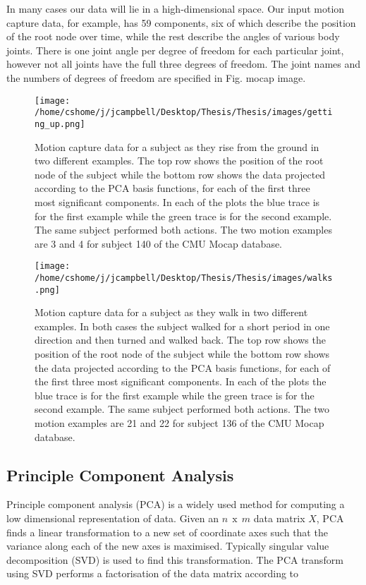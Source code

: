 In many cases our data will lie in a high-dimensional space. Our input motion capture data, for example, has 59 components, six of which describe the position of the root node over time, while the rest describe the angles of various body joints. There is one joint angle per degree of freedom for each particular joint, however not all joints have the full three degrees of freedom. The joint names and the numbers of degrees of freedom are specified in Fig. {mocap image}.\\

\begin{figure}[h]
\texttt{[image: /home/cshome/j/jcampbell/Desktop/Thesis/Thesis/images/getting\_up.png]}
\caption{Motion capture data for a subject as they rise from the ground in two 	different examples. The top row shows the position of the root node of the subject while the bottom row shows the data projected according to the PCA basis functions, for each of the first three most significant components. In each of the plots the blue trace is for the first example while the green trace is for the second example. The same subject performed both actions. The two motion examples are 3 and 4 for subject 140 of the CMU Mocap database. \label{getting_up}}
\end{figure}

\begin{figure}[h]
\texttt{[image: /home/cshome/j/jcampbell/Desktop/Thesis/Thesis/images/walks.png]}
\caption{Motion capture data for a subject as they walk in two different examples. In both cases the subject walked for a short period in one direction and then turned and walked back. The top row shows the position of the root node of the subject while the bottom row shows the data projected according to the PCA basis functions, for each of the first three most significant components. In each of the plots the blue trace is for the first example while the green trace is for the second example. The same subject performed both actions. The two motion examples are 21 and 22 for subject 136 of the CMU Mocap database. \label{walks}}
\end{figure}

\subsection{Principle Component Analysis}

Principle component analysis (PCA) is a widely used method for computing a low dimensional representation of data. Given an $n\:\:\text{x}\:\:m$ data matrix $X$, PCA finds a linear transformation to a new set of coordinate axes such that the variance along each of the new axes is maximised. Typically singular value decomposition (SVD) is used to find this transformation. The PCA transform using SVD performs a factorisation of the data matrix according to

